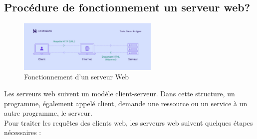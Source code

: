\subsection{Procédure de  fonctionnement un serveur web?}

\begin{figure}[h]
	\begin{center}
	\includegraphics[width=0.6\textwidth]{PhotoMemoire/serveurweb_fonct.jpg}
\end{center}
	\caption{Fonctionnement d'un serveur Web\cite{3}}
\end{figure}

Les serveurs web suivent un modèle client-serveur. Dans cette structure, un programme, également appelé client, demande une ressource ou un service à un autre programme, le serveur.\\

Pour traiter les requêtes des clients web, les serveurs web suivent quelques étapes nécessaires :


